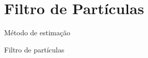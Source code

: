 \documentclass{beamer}
\begin{document}
%
%
%
%
%
%
%
%
%
%
%
%
%
%
%
%
%
%




\section{Filtro de Partículas}

\begin{frame}{Método de estimação}
    \begin{block}{}
      \Huge  Filtro de partículas
    \end{block}

\end{frame}
\end{document}
